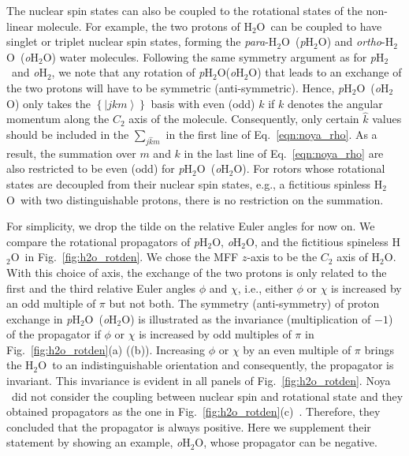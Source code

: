 \documentclass[12pt]{iopart}
\newcommand{\water}{H$_2$O}
\newcommand{\pwater}{{\em p}H$_2$O}
\newcommand{\owater}{{\em o}H$_2$O}
\newcommand{\phtwo}{{\em p}H$_2$}
\newcommand{\ohtwo}{{\em o}H$_2$}
\begin{document}
The nuclear spin states can also be coupled to the rotational states of the non-linear molecule. For example, the two protons of \water~can be coupled to have singlet or triplet nuclear spin states, forming the {\em para}-\water~(\pwater) and {\em ortho}-\water~(\owater) water molecules. 
Following the same symmetry argument as for \phtwo~and \ohtwo, we note that any rotation of \pwater (\owater) that leads to an exchange of the two protons will have to be symmetric (anti-symmetric). 
Hence, \pwater~(\owater) only takes the $\left\{\left|jkm \right> \right\}$ basis with even (odd) $k$ if $k$ denotes the angular momentum along the $C_2$ axis of the molecule. 
Consequently, only certain $\hat{k}$ values should be included in the $\sum_{j\hat{k}m}$ in the first line of Eq.~\ref{eqn:noya_rho}. 
As a result, the summation over $m$ and $k$ in the last line of Eq.~\ref{eqn:noya_rho} are also restricted to be even (odd) for \pwater~(\owater). 
For rotors whose rotational states are decoupled from their nuclear spin states, e.g., a fictitious spinless  \water~with two distinguishable protons, there is no restriction on the summation.

For simplicity, we drop the tilde on the relative Euler angles for now on. 
We compare the rotational propagators of \pwater, \owater, and the fictitious spineless \water~in Fig.~\ref{fig:h2o_rotden}. 
We chose the MFF $z$-axis to be the $C_2$ axis of \water. 
With this choice of axis, the exchange of the two protons is only related to the first and the third relative Euler angles $\phi$ and $\chi$, i.e., either $\phi$ or $\chi$ is increased by an odd multiple of $\pi$ but not both. 
The symmetry (anti-symmetry) of proton exchange in \pwater~(\owater) is illustrated as the invariance (multiplication of $-1$) of the propagator if $\phi$ or $\chi$ is increased by odd multiples of $\pi$ in Fig.~\ref{fig:h2o_rotden}(a) ((b)). Increasing $\phi$ or $\chi$ by an even multiple of $\pi$ brings the \water~to an indistinguishable orientation and consequently, the propagator is invariant. 
This invariance is evident in all panels of Fig.~\ref{fig:h2o_rotden}. 
Noya \etal~did not consider the coupling between nuclear spin and rotational state and they obtained propagators as the one in Fig.~\ref{fig:h2o_rotden}(c)~\cite{noya_rotden}. 
Therefore, they concluded that the propagator is always positive. Here we supplement their statement by showing an example, \owater, whose propagator can be negative.
\end{document}

